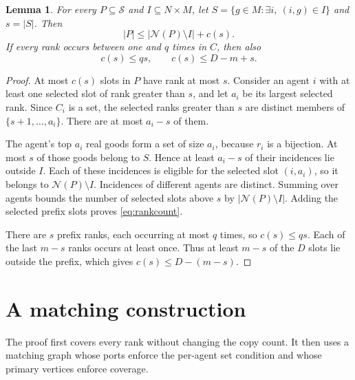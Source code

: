 \documentclass[11pt,a4paper]{article}
\newtheorem{lemma}[theorem]{Lemma}
\newcommand{\nbr}{\mathcal N}
\begin{document}
\begin{lemma}\label{lem:count}
For every $P\subseteq\mathcal S$ and $I\subseteq N\times M$, let
$S=\{g\in M:\exists i,\ (i,g)\in I\}$ and $s=|S|$. Then
\begin{equation}\label{eq:rankcount}
 |P|\le |\nbr(P)\setminus I|+c(s).
\end{equation}
If every rank occurs between one and $q$ times in $C$, then also
\begin{equation}\label{eq:prefixbounds}
 c(s)\le qs,\qquad c(s)\le D-m+s.
\end{equation}
\end{lemma}
\begin{proof}
At most $c(s)$ slots in $P$ have rank at most $s$. Consider an agent $i$
with at least one selected slot of rank greater than $s$, and let $a_i$ be
its largest selected rank. Since $C_i$ is a set, the selected ranks greater
than $s$ are distinct members of $\{s+1,\ldots,a_i\}$. There are at most
$a_i-s$ of them.

The agent's top $a_i$ real goods form a set of size $a_i$, because $r_i$ is
a bijection. At most $s$ of those goods belong to $S$. Hence at least
$a_i-s$ of their incidences lie outside $I$. Each of these incidences is
eligible for the selected slot $(i,a_i)$, so it belongs to
$\nbr(P)\setminus I$. Incidences of different agents are distinct.
Summing over agents bounds the number of selected slots above $s$ by
$|\nbr(P)\setminus I|$. Adding the selected prefix slots proves
\eqref{eq:rankcount}.

There are $s$ prefix ranks, each occurring at most $q$ times, so $c(s)\le qs$.
Each of the last $m-s$ ranks occurs at least once. Thus at least $m-s$ of
the $D$ slots lie outside the prefix, which gives $c(s)\le D-(m-s)$.
\end{proof}

\section{A matching construction}\label{sec:proof}
The proof first covers every rank without changing the copy count. It then
uses a matching graph whose ports enforce the per-agent set condition and
whose primary vertices enforce coverage.
\end{document}
